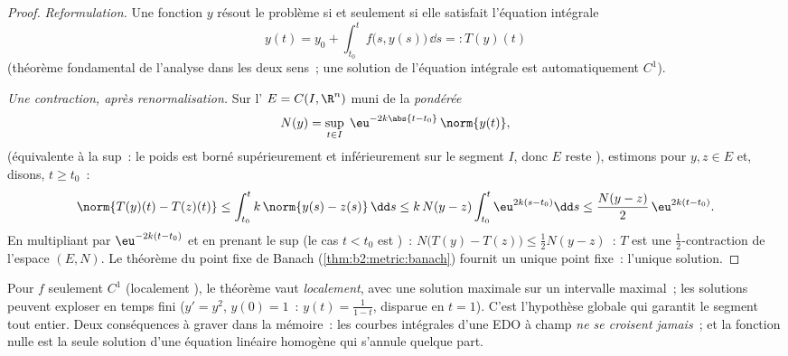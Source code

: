 \begin{proof}
\emph{Reformulation.} Une fonction  $y$ résout le problème
si et seulement si elle satisfait l'équation intégrale
\[
y(t) = y_0 + \int_{t_0}^{t} f\bigl(s, y(s)\bigr)\,\dd s
=: T(y)(t)
\]
(théorème fondamental de l'analyse dans les deux sens~; une solution
 de l'équation intégrale est automatiquement $C^1$).

\emph{Une contraction, après renormalisation.} Sur l' $E = C(I, \R^n)$ muni de la  \emph{pondérée}
\[
N(y) = \sup_{t \in I}\; \eu^{-2k\abs{t - t_0}}\,\norm{y(t)} ,
\]
(équivalente à la  sup~: le poids est borné supérieurement et
inférieurement sur le segment $I$, donc $E$ reste ),
estimons pour $y, z \in E$ et, disons, $t \geq t_0$~:
\[
\norm{T(y)(t) - T(z)(t)}
\leq \int_{t_0}^{t} k\,\norm{y(s) - z(s)}\,\dd s
\leq k\,N(y - z)\int_{t_0}^{t} \eu^{2k(s - t_0)}\dd s
\leq \frac{N(y-z)}{2}\,\eu^{2k(t - t_0)} .
\]
En multipliant par $\eu^{-2k(t - t_0)}$ et en prenant le sup (le cas
$t < t_0$ est )~: $N\bigl(T(y) - T(z)\bigr) \leq \frac12 N(y -
z)$~: $T$ est une $\frac12$-contraction de l'espace  $(E, N)$.
Le théorème du point fixe de Banach (\cref{thm:b2:metric:banach})
fournit un unique point fixe~: l'unique solution.
\end{proof}

\begin{remark}
Pour $f$ seulement $C^1$ (localement ), le théorème
vaut \emph{localement}, avec une solution maximale sur un intervalle
 maximal~; les solutions peuvent exploser en temps fini ($y' =
y^2$, $y(0) = 1$~: $y(t) = \frac{1}{1-t}$, disparue en $t = 1$).
C'est l'hypothèse  globale qui garantit le segment tout
entier. Deux conséquences à graver dans la mémoire~: les courbes
intégrales d'une EDO à champ  \emph{ne se croisent
jamais}~; et la fonction nulle est la seule solution d'une équation
linéaire homogène qui s'annule quelque part.
\end{remark}

